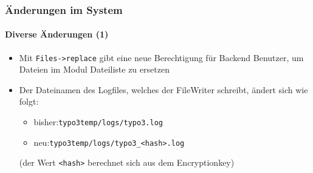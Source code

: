 
\begin{frame}[fragile]
	\frametitle{Änderungen im System}
	\framesubtitle{Diverse Änderungen (1)}

	\lstset{basicstyle=\tiny\ttfamily}

	\begin{itemize}

		\item Mit \texttt{Files->replace} gibt eine neue Berechtigung für Backend Benutzer,
			um Dateien im Modul Dateiliste zu ersetzen


		\item Der Dateinamen des Logfiles, welches der FileWriter schreibt, ändert sich wie folgt:

			\begin{itemize}
				\item bisher:\tabto{1.2cm}\texttt{typo3temp/logs/typo3.log}
				\item neu:\tabto{1.2cm}\texttt{typo3temp/logs/typo3\_<hash>.log}
			\end{itemize}

			\small(der Wert \texttt{<hash>} berechnet sich aus dem Encryptionkey)\normalsize


	\end{itemize}

\end{frame}


